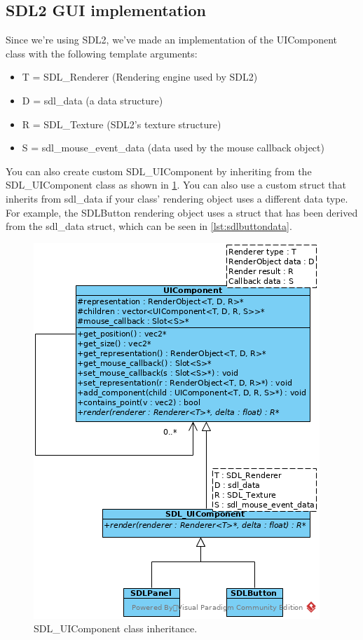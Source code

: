 \subsection{SDL2 GUI implementation}
\label{sec:sdl2gui}

Since we're using SDL2, we've made an implementation of the UIComponent class
 with the following template arguments:
\begin{itemize}
\item T = SDL\_Renderer (Rendering engine used by SDL2)
\item D = sdl\_data (a data structure)
\item R = SDL\_Texture (SDL2's texture structure)
\item S = sdl\_mouse\_event\_data (data used by the mouse callback object)
\end{itemize}

You can also create custom SDL\_UIComponent by inheriting from the 
SDL\_UIComponent class as shown in \cref{fig:sdluicomponent-inherit}. You can 
also use a custom struct that inherits from sdl\_data if your class' 
rendering object uses a different data type. For example, the SDLButton 
rendering object uses a struct that has been derived from the sdl\_data 
struct, which can be seen in \cref{lst:sdlbuttondata}.

\begin{figure}[!htb]
\centering
\includegraphics[scale=0.75]{res/ui/sdluicomponent-inherit.png}
\caption{SDL\_UIComponent class inheritance.}\label{fig:sdluicomponent-inherit}
\end{figure}
